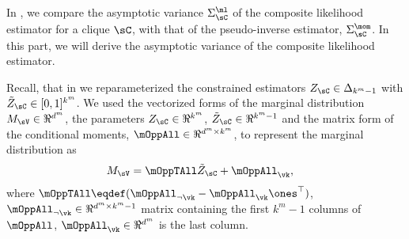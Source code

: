\subsection{}
\label{app:pw-proof}

In , we compare the asymptotic variance
  $\Sigma^\ml_\sC$ of the composite likelihood estimator for a clique
  $\sC$, with that of the pseudo-inverse estimator, $\Sigma^\mom_\sC$. 
In this part, we will derive the asymptotic variance of the composite
  likelihood estimator.

Recall, that in  we reparameterized the
constrained estimators $Z_\sC \in \Delta_{k^m-1}$ with $\tilde Z_\sC \in
[0,1]^{k^m}$. We used the vectorized forms of the marginal distribution $M_\sV
\in \Re^{d^m}$, the parameters $Z_\sC \in \Re^{k^m}$, $\tilde Z_\sC \in \Re^{k^m-1}$
and the matrix form of the conditional moments, $\mOppAll \in \Re^{d^m \times k^m}$, to represent the marginal distribution as
\begin{align*}
  M_\sV &= \mOppTAll \tilde Z_\sC + \mOppAll_{\vk},
\end{align*}
where $\mOppTAll \eqdef (\mOppAll_{\neg \vk}
- \mOppAll_{\vk}\ones^\top)$, $\mOppAll_{\neg \vk} \in \Re^{d^m \times
k^m - 1}$ matrix containing the first $k^m-1$ columns of $\mOppAll$,
$\mOppAll_\vk \in \Re^{d^m}$ is the last column.

